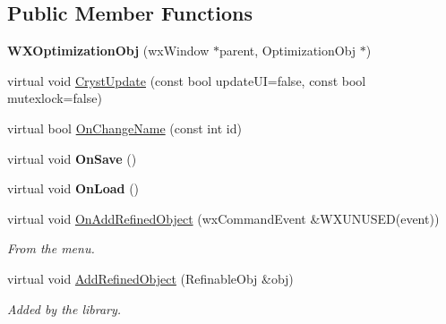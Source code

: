 \subsection*{Public Member Functions}
\begin{DoxyCompactItemize}
\item 
\mbox{\label{class_obj_cryst_1_1_w_x_optimization_obj_a2b86113122800cbad785f564ea63472c}} 
{\bfseries W\+X\+Optimization\+Obj} (wx\+Window $\ast$parent, Optimization\+Obj $\ast$)
\item 
virtual void \mbox{\hyperlink{class_obj_cryst_1_1_w_x_optimization_obj_a742684b478a21cec25a74c2b39914d80}{Cryst\+Update}} (const bool update\+UI=false, const bool mutexlock=false)
\item 
virtual bool \mbox{\hyperlink{class_obj_cryst_1_1_w_x_optimization_obj_a01117540dd4857fd238caf16c391a691}{On\+Change\+Name}} (const int id)
\item 
\mbox{\label{class_obj_cryst_1_1_w_x_optimization_obj_a81d7c826519ab285b8eece182b26ec3a}} 
virtual void {\bfseries On\+Save} ()
\item 
\mbox{\label{class_obj_cryst_1_1_w_x_optimization_obj_a6905ab3c4a8b29ee02d61c089580d9b0}} 
virtual void {\bfseries On\+Load} ()
\item 
\mbox{\label{class_obj_cryst_1_1_w_x_optimization_obj_a7d1d648652bb01bbb8fb7b990714d453}} 
virtual void \mbox{\hyperlink{class_obj_cryst_1_1_w_x_optimization_obj_a7d1d648652bb01bbb8fb7b990714d453}{On\+Add\+Refined\+Object}} (wx\+Command\+Event \&W\+X\+U\+N\+U\+S\+ED(event))
\begin{DoxyCompactList}\small\item\em From the menu. \end{DoxyCompactList}\item 
\mbox{\label{class_obj_cryst_1_1_w_x_optimization_obj_aba1730ee3d8e042f7449877051241cb9}} 
virtual void \mbox{\hyperlink{class_obj_cryst_1_1_w_x_optimization_obj_aba1730ee3d8e042f7449877051241cb9}{Add\+Refined\+Object}} (Refinable\+Obj \&obj)
\begin{DoxyCompactList}\small\item\em Added by the library. \end{DoxyCompactList}\item 

\end{DoxyCompactItemize}

